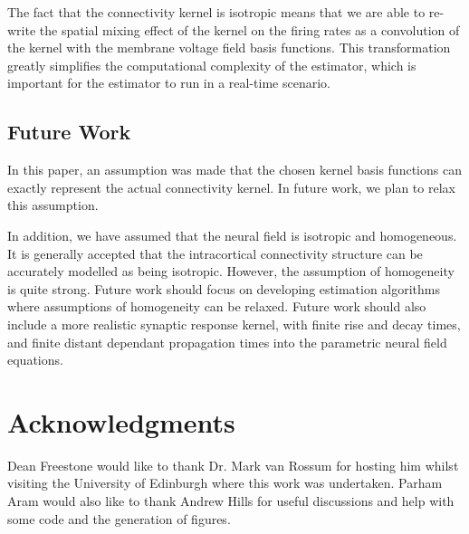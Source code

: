 \documentclass[10pt]{article}
\begin{document}
The fact that the connectivity kernel is isotropic means that we are able to re-write the spatial mixing effect of the kernel on the firing rates as a convolution of the kernel with the membrane voltage field basis functions. This transformation greatly simplifies the computational complexity of the estimator, which is important for the estimator to run in a real-time scenario.

\subsection*{Future Work}

In this paper, an assumption was made that the chosen kernel basis functions can exactly represent the actual connectivity kernel. In future work, we plan to relax this assumption.

In addition, we have assumed that the neural field is isotropic and homogeneous. It is generally accepted that the intracortical connectivity structure can be accurately modelled as being isotropic. However, the assumption of homogeneity is quite strong. Future work should focus on developing estimation algorithms where assumptions of homogeneity can be relaxed. Future work should also include a more realistic synaptic response kernel, with finite rise and decay times, and finite distant dependant propagation times into the parametric neural field equations.


\section*{Acknowledgments}
Dean Freestone would like to thank Dr. Mark van Rossum for hosting him whilst visiting the University of Edinburgh where this work was undertaken. Parham Aram would also like to thank Andrew Hills for useful discussions and help with some code and the generation of figures.



\end{document}
